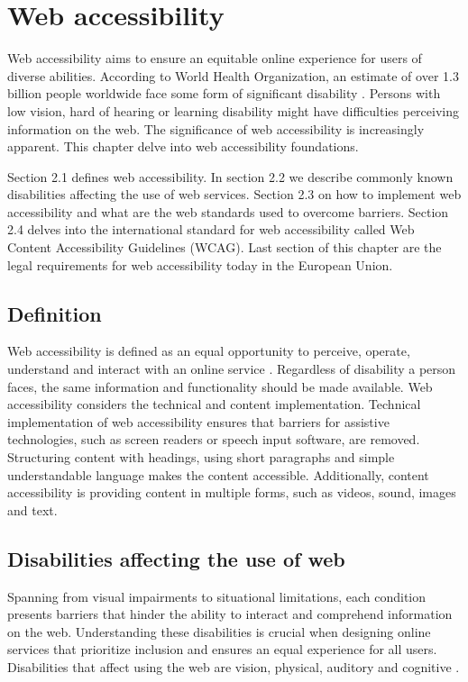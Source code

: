 \chapter{Web accessibility\label{accessibility}}

Web accessibility aims to ensure an equitable online experience for users of diverse abilities. According to World Health Organization, an estimate of over 1.3 billion people worldwide face some form of significant disability \citep{whodisability}. Persons with low vision, hard of hearing or learning disability might have difficulties perceiving information on the web. The significance of web accessibility is increasingly apparent. This chapter delve into web accessibility foundations. 

Section 2.1 defines web accessibility. In section 2.2 we describe commonly known disabilities affecting the use of web services. Section 2.3 on how to implement web accessibility and what are the web standards used to overcome barriers. Section 2.4 delves into the international standard for web accessibility called Web Content Accessibility Guidelines (WCAG). Last section of this chapter are the legal requirements for web accessibility today in the European Union.

\section{Definition}

Web accessibility is defined as an equal opportunity to perceive, operate, understand and interact with an online service \citep{webaccessibilitydefinition}. Regardless of disability a person faces, the same information and functionality should be made available. Web accessibility considers the technical and content implementation. Technical implementation of web accessibility ensures that barriers for assistive technologies, such as screen readers or speech input software, are removed. Structuring content with headings, using short paragraphs and simple understandable language makes the content accessible. Additionally, content accessibility is providing content in multiple forms, such as videos, sound, images and text.

\section{Disabilities affecting the use of web}

Spanning from visual impairments to situational limitations, each condition presents barriers that hinder the ability to interact and comprehend information on the web. Understanding these disabilities is crucial when designing online services that prioritize inclusion and ensures an equal experience for all users. Disabilities that affect using the web are vision, physical, auditory and cognitive \citep{w3cbarriers}.

